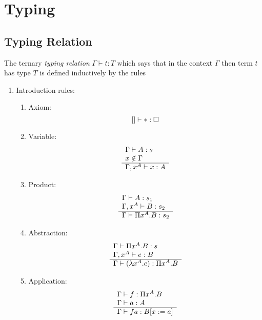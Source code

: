 \section{Typing}
\label{sec:Typing}




\subsection{Typing Relation}

\begin{definition}
The ternary \emph{typing relation} $\Gamma \vdash t: T$ which says that in
the context $\Gamma$ then term $t$ has type $T$ is defined inductively by
the rules
\begin{enumerate}
    \item Introduction rules:
    \begin{enumerate}
        \item Axiom:
            $$
            [] \vdash * : \Box
            $$

        \item Variable:
            $$
            \begin{array}{l} 
                \Gamma \vdash A: s
                \\
                x \notin \Gamma
             \\ \hline 
                \Gamma, x^A \vdash x: A
            \end{array}
            $$

        \item Product:
            $$
            \begin{array}{l} 
                \Gamma \vdash A: s_1
                \\
                \Gamma, x^A \vdash B: s_2
             \\ \hline 
                \Gamma \vdash \Pi x^A.B : s_2
            \end{array}
            $$

        \item Abstraction:
            $$
            \begin{array}{l} 
                \Gamma \vdash \Pi x^A. B: s
                \\
                \Gamma, x^A \vdash e: B
             \\ \hline 
                \Gamma \vdash (\lambda x^A. e): \Pi x^A. B
            \end{array}
            $$

        \item Application:
            $$
            \begin{array}{l} 
                \Gamma \vdash f: \Pi x^A. B
                \\
                \Gamma \vdash a: A
             \\ \hline 
                \Gamma \vdash f a: B[x:=a]
            \end{array}
            $$
    \end{enumerate}



\end{enumerate}
\end{definition}

